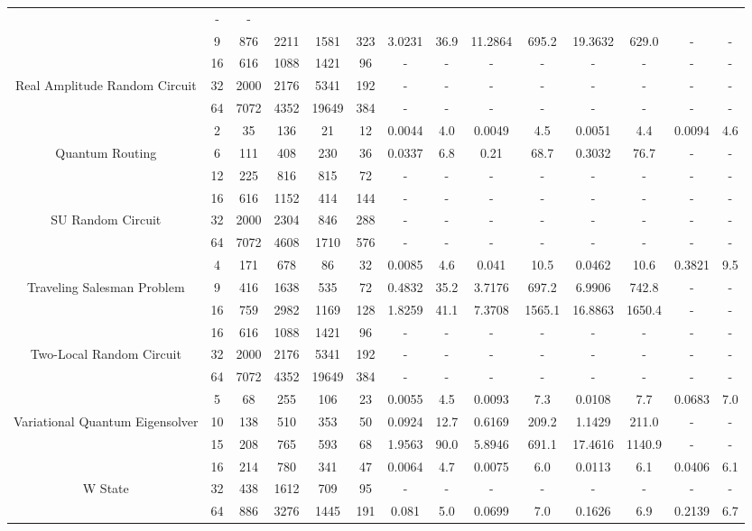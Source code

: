 \begin{table}[htb]
{\begin{tabular}{|c|c|c|c|c|c|c|c|c|c|c|c|c|c|}
 & - & -
 \\
 & 
9 & 876 & 2211 & 1581 & 323
 & 3.0231 & 36.9
 & 11.2864 & 695.2
 & 19.3632 & 629.0
 & - & -
 \\
\hline
 & 
16 & 616 & 1088 & 1421 & 96
 & - & -
 & - & -
 & - & -
 & - & -
 \\
Real Amplitude Random Circuit & 
32 & 2000 & 2176 & 5341 & 192
 & - & -
 & - & -
 & - & -
 & - & -
 \\
 & 
64 & 7072 & 4352 & 19649 & 384
 & - & -
 & - & -
 & - & -
 & - & -
 \\
\hline
 & 
2 & 35 & 136 & 21 & 12
 & 0.0044 & 4.0
 & 0.0049 & 4.5
 & 0.0051 & 4.4
 & 0.0094 & 4.6
 \\
Quantum Routing & 
6 & 111 & 408 & 230 & 36
 & 0.0337 & 6.8
 & 0.21 & 68.7
 & 0.3032 & 76.7
 & - & -
 \\
 & 
12 & 225 & 816 & 815 & 72
 & - & -
 & - & -
 & - & -
 & - & -
 \\
\hline
 & 
16 & 616 & 1152 & 414 & 144
 & - & -
 & - & -
 & - & -
 & - & -
 \\
SU Random Circuit & 
32 & 2000 & 2304 & 846 & 288
 & - & -
 & - & -
 & - & -
 & - & -
 \\
 & 
64 & 7072 & 4608 & 1710 & 576
 & - & -
 & - & -
 & - & -
 & - & -
 \\
\hline
 & 
4 & 171 & 678 & 86 & 32
 & 0.0085 & 4.6
 & 0.041 & 10.5
 & 0.0462 & 10.6
 & 0.3821 & 9.5
 \\
Traveling Salesman Problem & 
9 & 416 & 1638 & 535 & 72
 & 0.4832 & 35.2
 & 3.7176 & 697.2
 & 6.9906 & 742.8
 & - & -
 \\
 & 
16 & 759 & 2982 & 1169 & 128
 & 1.8259 & 41.1
 & 7.3708 & 1565.1
 & 16.8863 & 1650.4
 & - & -
 \\
\hline
 & 
16 & 616 & 1088 & 1421 & 96
 & - & -
 & - & -
 & - & -
 & - & -
 \\
Two-Local Random Circuit & 
32 & 2000 & 2176 & 5341 & 192
 & - & -
 & - & -
 & - & -
 & - & -
 \\
 & 
64 & 7072 & 4352 & 19649 & 384
 & - & -
 & - & -
 & - & -
 & - & -
 \\
\hline
 & 
5 & 68 & 255 & 106 & 23
 & 0.0055 & 4.5
 & 0.0093 & 7.3
 & 0.0108 & 7.7
 & 0.0683 & 7.0
 \\
Variational Quantum Eigensolver & 
10 & 138 & 510 & 353 & 50
 & 0.0924 & 12.7
 & 0.6169 & 209.2
 & 1.1429 & 211.0
 & - & -
 \\
 & 
15 & 208 & 765 & 593 & 68
 & 1.9563 & 90.0
 & 5.8946 & 691.1
 & 17.4616 & 1140.9
 & - & -
 \\
\hline
 & 
16 & 214 & 780 & 341 & 47
 & 0.0064 & 4.7
 & 0.0075 & 6.0
 & 0.0113 & 6.1
 & 0.0406 & 6.1
 \\
W State & 
32 & 438 & 1612 & 709 & 95
 & - & -
 & - & -
 & - & -
 & - & -
 \\
 & 
64 & 886 & 3276 & 1445 & 191
 & 0.081 & 5.0
 & 0.0699 & 7.0
 & 0.1626 & 6.9
 & 0.2139 & 6.7
 \\
\hline
\end{tabular}}
\end{table}
